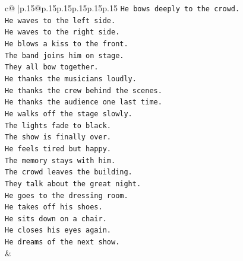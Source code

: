 \documentclass{article}
\begin{document}
{\begin{supertabular}{c@{$\;$}|p{.15\linewidth}@{}p{.15\linewidth}p{.15\linewidth}p{.15\linewidth}p{.15\linewidth}p{.15\linewidth}}
{{{\texttt{He bows deeply to the crowd.} \\
\texttt{He waves to the left side.} \\
\texttt{He waves to the right side.} \\
\texttt{He blows a kiss to the front.} \\
\texttt{The band joins him on stage.} \\
\texttt{They all bow together.} \\
\texttt{He thanks the musicians loudly.} \\
\texttt{He thanks the crew behind the scenes.} \\
\texttt{He thanks the audience one last time.} \\
\texttt{He walks off the stage slowly.} \\
\texttt{The lights fade to black.} \\
\texttt{The show is finally over.} \\
\texttt{He feels tired but happy.} \\
\texttt{The memory stays with him.} \\
\texttt{The crowd leaves the building.} \\
\texttt{They talk about the great night.} \\
\texttt{He goes to the dressing room.} \\
\texttt{He takes off his shoes.} \\
\texttt{He sits down on a chair.} \\
\texttt{He closes his eyes again.} \\
\texttt{He dreams of the next show.} \\
            }
        }
    }
    & \\ \\


\end{supertabular}}
\end{document}
